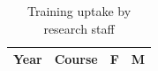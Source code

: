
\begin{table}[!ht]
\colorbox{orangebg}{
      \begin{minipage}{14.2cm}
\footnotesize 
    \caption{Training uptake by research staff}
    \label{tab:training:researchstaff}
    
    \begin{tabular}{p{1.3cm}
                    p{9.5cm}
                    R{1cm}
                    R{1cm}}
    
    \toprule 
    Year & Course & F & M \\
    \midrule
    


    
    \bottomrule      
         
    \end{tabular}
    
\end{minipage} 
}

\end{table}